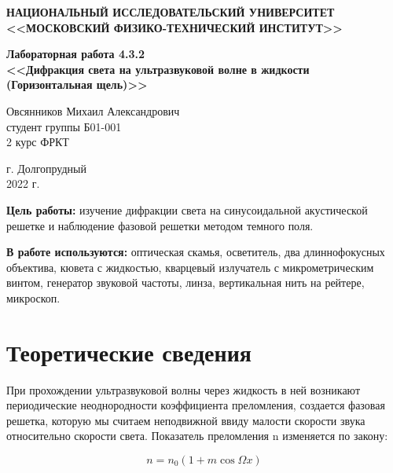 \documentclass[a4paper,12pt]{article} %
\begin{document}
	
	
	\begin{center}
		
		
		\textbf{НАЦИОНАЛЬНЫЙ ИССЛЕДОВАТЕЛЬСКИЙ УНИВЕРСИТЕТ \\ <<МОСКОВСКИЙ ФИЗИКО-ТЕХНИЧЕСКИЙ ИНСТИТУТ>>}
		\vspace{13ex}
		
		\textbf{Лабораторная работа 4.3.2\\ <<Дифракция света на ультразвуковой волне в жидкости \\ (Горизонтальная щель)>>}
		\vspace{40ex}
		
		\normalsize{Овсянников Михаил Александрович \\ студент группы Б01-001\\ 2 курс ФРКТ\\}
	\end{center}
	
	\vfill 
	
	\begin{center}
		г. Долгопрудный\\ 
		2022 г.
	\end{center}
	
	
	\thispagestyle{empty} %
	\newpage
	
	
	\textbf{Цель работы:} изучение дифракции света на синусоидальной акустической решетке и наблюдение фазовой решетки методом темного поля.
	
	\textbf{В работе используются:} оптическая скамья, осветитель, два длиннофокусных объектива, кювета с жидкостью, кварцевый излучатель с микрометрическим винтом, генератор звуковой частоты, линза, вертикальная нить на рейтере, микроскоп.
	
	
	
	
	\section*{Теоретические сведения}

	
	При прохождении ультразвуковой волны через жидкость в ней возникают периодические неоднородности коэффициента преломления, создается фазовая решетка, которую мы считаем неподвижной ввиду малости скорости звука относительно скорости света. Показатель
	преломления n изменяется по закону:
	
	\begin{equation*}
		n = n_0 (1 + m \cos \Omega x)
	\end{equation*}
	
\end{document}
